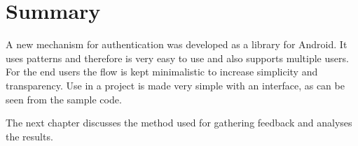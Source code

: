 \section{Summary}
A new mechanism for authentication was developed as a library for Android. It uses patterns and therefore is very easy to use and also supports multiple users. For the end users the flow is kept minimalistic to increase simplicity and transparency. Use in a project is made very simple with an interface, as can be seen from the sample code. 

The next chapter discusses the method used for gathering feedback and analyses the results. 




